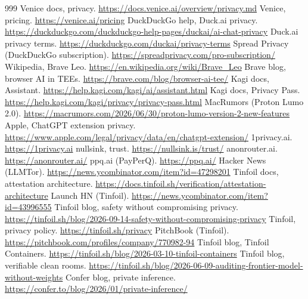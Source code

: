 \documentclass[10pt,a4paper]{article}
\begin{document}
\begin{thebibliography}{999}
 Venice docs, privacy. \url{https://docs.venice.ai/overview/privacy.md}
 Venice, pricing. \url{https://venice.ai/pricing}
 DuckDuckGo help, Duck.ai privacy. \url{https://duckduckgo.com/duckduckgo-help-pages/duckai/ai-chat-privacy}
 Duck.ai privacy terms. \url{https://duckduckgo.com/duckai/privacy-terms}
 Spread Privacy (DuckDuckGo subscription). \url{https://spreadprivacy.com/pro-subscription/}
 Wikipedia, Brave Leo. \url{https://en.wikipedia.org/wiki/Brave_Leo}
 Brave blog, browser AI in TEEs. \url{https://brave.com/blog/browser-ai-tee/}
 Kagi docs, Assistant. \url{https://help.kagi.com/kagi/ai/assistant.html}
 Kagi docs, Privacy Pass. \url{https://help.kagi.com/kagi/privacy/privacy-pass.html}
 MacRumors (Proton Lumo 2.0). \url{https://macrumors.com/2026/06/30/proton-lumo-version-2-new-features}
 Apple, ChatGPT extension privacy. \url{https://www.apple.com/legal/privacy/data/en/chatgpt-extension/}
 1privacy.ai. \url{https://1privacy.ai}
 nullsink, trust. \url{https://nullsink.is/trust/}
 anonrouter.ai. \url{https://anonrouter.ai/}
 ppq.ai (PayPerQ). \url{https://ppq.ai/}
 Hacker News (LLMTor). \url{https://news.ycombinator.com/item?id=47298201}
 Tinfoil docs, attestation architecture. \url{https://docs.tinfoil.sh/verification/attestation-architecture}
 Launch HN (Tinfoil). \url{https://news.ycombinator.com/item?id=43996555}
 Tinfoil blog, safety without compromising privacy. \url{https://tinfoil.sh/blog/2026-09-14-safety-without-compromising-privacy}
 Tinfoil, privacy policy. \url{https://tinfoil.sh/privacy}
 PitchBook (Tinfoil). \url{https://pitchbook.com/profiles/company/770982-94}
 Tinfoil blog, Tinfoil Containers. \url{https://tinfoil.sh/blog/2026-03-10-tinfoil-containers}
 Tinfoil blog, verifiable clean rooms. \url{https://tinfoil.sh/blog/2026-06-09-auditing-frontier-model-without-weights}
 Confer blog, private inference. \url{https://confer.to/blog/2026/01/private-inference/}

\end{thebibliography}
\end{document}
